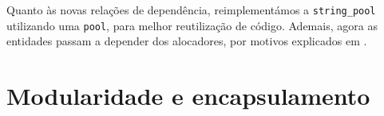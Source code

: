 \documentclass[12pt, a4paper]{article}
\begin{document}
Quanto às novas relações de dependência, reimplementámos a \texttt{string\_pool} utilizando uma
\texttt{pool}, para melhor reutilização de código. Ademais, agora as entidades passam a depender
dos alocadores, por motivos explicados em .

\section{Modularidade e encapsulamento}
\label{sec:modularity-and-encapsulation}
\end{document}
